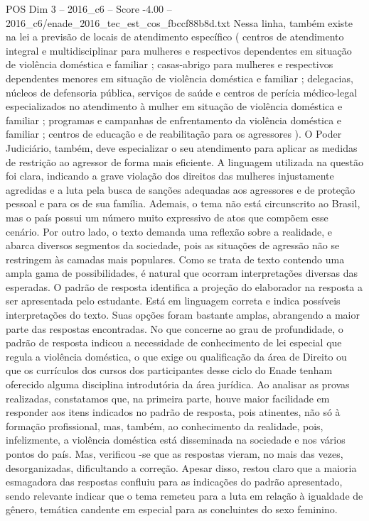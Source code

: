 \begin{textsample}{POS Dim 3 – 2016\_c6 – Score -4.00 – 2016\_c6/enade\_2016\_tec\_est\_cos\_fbccf88b8d.txt}
Nessa linha, também existe na lei a previsão de locais de atendimento específico ( centros de atendimento integral e multidisciplinar para mulheres e respectivos dependentes em situação de violência doméstica e familiar ; casas-abrigo para mulheres e respectivos dependentes menores em situação de violência doméstica e familiar ; delegacias, núcleos de defensoria pública, serviços de saúde e centros de perícia médico-legal especializados no atendimento à mulher em situação de violência doméstica e familiar ; programas e campanhas de enfrentamento da violência doméstica e familiar ; centros de educação e de reabilitação para os agressores ).
O Poder Judiciário, também, deve especializar o seu atendimento para aplicar as medidas de restrição ao agressor de forma mais eficiente.
A linguagem utilizada na questão foi clara, indicando a grave violação dos direitos das mulheres injustamente agredidas e a luta pela busca de sanções adequadas aos agressores e de proteção pessoal e para os de sua família.
Ademais, o tema não está circunscrito ao Brasil, mas o país possui um número muito expressivo de atos que compõem esse cenário.
Por outro lado, o texto demanda uma reflexão sobre a realidade, e abarca diversos segmentos da sociedade, pois as situações de agressão não se restringem às camadas mais populares.
Como se trata de texto contendo uma ampla gama de possibilidades, é natural que ocorram interpretações diversas das esperadas.
O padrão de resposta identifica a projeção do elaborador na resposta a ser apresentada pelo estudante.
Está em linguagem correta e indica possíveis interpretações do texto.
Suas opções foram bastante amplas, abrangendo a maior parte das respostas encontradas.
No que concerne ao grau de profundidade, o padrão de resposta indicou a necessidade de conhecimento de lei especial que regula a violência doméstica, o que exige ou qualificação da área de Direito ou que os currículos dos cursos dos participantes desse ciclo do Enade tenham oferecido alguma disciplina introdutória da área jurídica.
Ao analisar as provas realizadas, constatamos que, na primeira parte, houve maior facilidade em responder aos itens indicados no padrão de resposta, pois atinentes, não só à formação profissional, mas, também, ao conhecimento da realidade, pois, infelizmente, a violência doméstica está disseminada na sociedade e nos vários pontos do país.
Mas, verificou -se que as respostas vieram, no mais das vezes, desorganizadas, dificultando a correção.
Apesar disso, restou claro que a maioria esmagadora das respostas confluiu para as indicações do padrão apresentado, sendo relevante indicar que o tema remeteu para a luta em relação à igualdade de gênero, temática candente em especial para as concluintes do sexo feminino.

\end{textsample}
